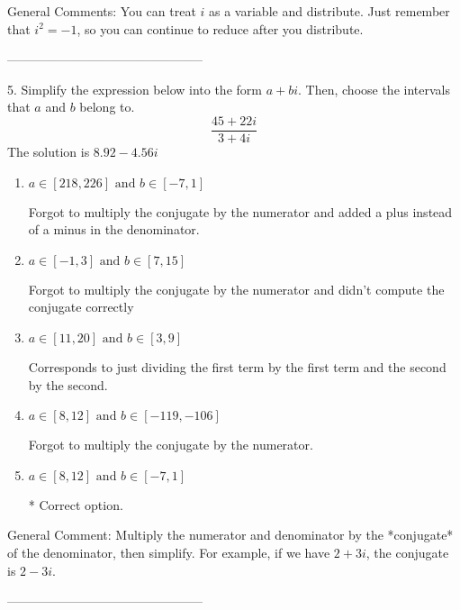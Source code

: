\documentclass{article}[10pt]
\begin{document}
General Comments: You can treat $i$ as a variable and distribute. Just remember that $i^2=-1$, so you can continue to reduce after you distribute.

-----------------------------------------------

5. Simplify the expression below into the form $a+bi$. Then, choose the intervals that $a$ and $b$ belong to.
$$ \frac{45+22i}{3+4i} $$ 
The solution is $ 8.92 - 4.56 i $ 

\begin{enumerate}[label=\Alph*.] 
\item $ a \in [218, 226] \text{ and } b \in [-7, 1] $ 

  Forgot to multiply the conjugate by the numerator and added a plus instead of a minus in the denominator. 
\item $ a \in [-1, 3] \text{ and } b \in [7, 15] $ 

  Forgot to multiply the conjugate by the numerator and didn't compute the conjugate correctly 
\item $ a \in [11, 20] \text{ and } b \in [3, 9] $ 

  Corresponds to just dividing the first term by the first term and the second by the second. 
\item $ a \in [8, 12] \text{ and } b \in [-119, -106] $ 

  Forgot to multiply the conjugate by the numerator. 
\item $ a \in [8, 12] \text{ and } b \in [-7, 1] $ 

 * Correct option. 
\end{enumerate} 
 
General Comment: Multiply the numerator and denominator by the *conjugate* of the denominator, then simplify. For example, if we have $2+3i$, the conjugate is $2-3i$.

-----------------------------------------------
\end{document}
